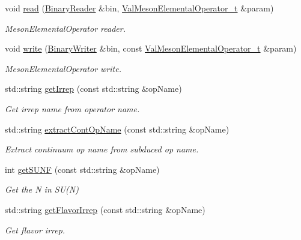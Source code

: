 \begin{DoxyCompactItemize}
void \mbox{\hyperlink{namespaceHadron_ae34c01603f5e8f9246374fddfaa8e062}{read}} (\mbox{\hyperlink{classADATIO_1_1BinaryReader}{Binary\+Reader}} \&bin, \mbox{\hyperlink{structHadron_1_1ValMesonElementalOperator__t}{Val\+Meson\+Elemental\+Operator\+\_\+t}} \&param)
\begin{DoxyCompactList}\small\item\em Meson\+Elemental\+Operator reader. \end{DoxyCompactList}\item 
void \mbox{\hyperlink{namespaceHadron_af16b79349f97386286cfc1cd9dfb73f0}{write}} (\mbox{\hyperlink{classADATIO_1_1BinaryWriter}{Binary\+Writer}} \&bin, const \mbox{\hyperlink{structHadron_1_1ValMesonElementalOperator__t}{Val\+Meson\+Elemental\+Operator\+\_\+t}} \&param)
\begin{DoxyCompactList}\small\item\em Meson\+Elemental\+Operator write. \end{DoxyCompactList}\item 
std\+::string \mbox{\hyperlink{namespaceHadron_a33d1d1e15a13f881d974049a8ae1c3dc}{get\+Irrep}} (const std\+::string \&op\+Name)
\begin{DoxyCompactList}\small\item\em Get irrep name from operator name. \end{DoxyCompactList}\item 
std\+::string \mbox{\hyperlink{namespaceHadron_a0b8fc65d4da647ad0c70885da63e157e}{extract\+Cont\+Op\+Name}} (const std\+::string \&op\+Name)
\begin{DoxyCompactList}\small\item\em Extract continuum op name from subduced op name. \end{DoxyCompactList}\item 
int \mbox{\hyperlink{namespaceHadron_a61e330de82814218612462c430ceaeb9}{get\+S\+U\+NF}} (const std\+::string \&op\+Name)
\begin{DoxyCompactList}\small\item\em Get the N in S\+U(\+N) \end{DoxyCompactList}\item 
std\+::string \mbox{\hyperlink{namespaceHadron_ad5a318554ed24d3e28841abd57345adf}{get\+Flavor\+Irrep}} (const std\+::string \&op\+Name)
\begin{DoxyCompactList}\small\item\em Get flavor irrep. \end{DoxyCompactList}\item 

\end{DoxyCompactItemize}
